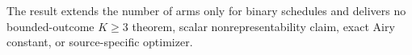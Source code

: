 The result extends the number of arms only for binary schedules and delivers no bounded-outcome \(K\geq3\) theorem, scalar nonrepresentability claim, exact Airy constant, or source-specific optimizer.